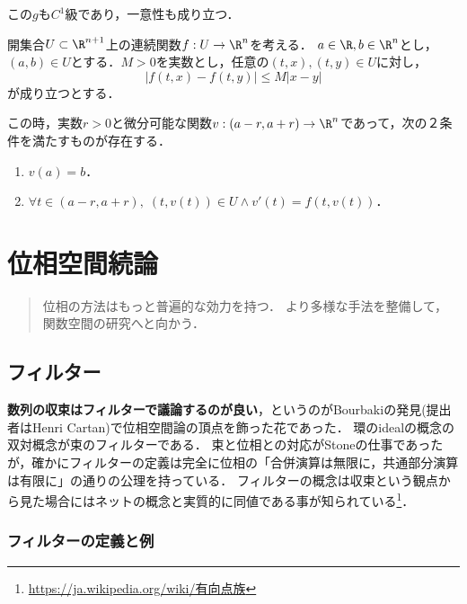 \documentclass[uplatex,dvipdfmx]{jsreport}
\begin{document}
\begin{corollary}
    この$g$も$C^1$級であり，一意性も成り立つ．
\end{corollary}

\begin{theorem}[常微分方程式の解の存在定理]
    開集合$U\subset\R^{n+1}$上の連続関数$f:U\to\R^{n}$を考える．
    $a\in\R,b\in\R^n$とし，$(a,b)\in U$とする．$M>0$を実数とし，任意の$(t,x),(t,y)\in U$に対し，
    \[ |f(t,x)-f(t,y)|\le M|x-y| \]
    が成り立つとする．

    この時，実数$r>0$と微分可能な関数$v:(a-r,a+r)\to\R^n$であって，次の２条件を満たすものが存在する．
    \begin{enumerate}
        \item $v(a)=b$．
        \item $\forall t\in(a-r,a+r),\;(t,v(t))\in U\land v'(t)=f(t,v(t))$．
    \end{enumerate}
\end{theorem}

\chapter{位相空間続論}

\begin{quotation}
    位相の方法はもっと普遍的な効力を持つ．
    より多様な手法を整備して，関数空間の研究へと向かう．
\end{quotation}

\section{フィルター}

\begin{tcolorbox}[colframe=ForestGreen, colback=ForestGreen!10!white,breakable,colbacktitle=ForestGreen!40!white,coltitle=black,fonttitle=\bfseries\sffamily,
title=]
    \textbf{数列の収束はフィルターで議論するのが良い}，というのがBourbakiの発見(提出者はHenri Cartan)で位相空間論の頂点を飾った花であった．
    環のidealの概念の双対概念が束のフィルターである．
    束と位相との対応がStoneの仕事であったが，確かにフィルターの定義は完全に位相の「合併演算は無限に，共通部分演算は有限に」の通りの公理を持っている．
    フィルターの概念は収束という観点から見た場合にはネットの概念と実質的に同値である事が知られている\footnote{\url{https://ja.wikipedia.org/wiki/有向点族}}．
\end{tcolorbox}

\subsection{フィルターの定義と例}
\end{document}
